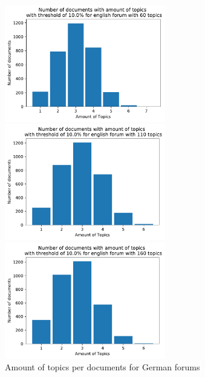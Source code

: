 \begin{figure}[t]
	\centering
	\includegraphics[width=7cm]{gfx/GrafikenFinal/englishforumlda_topPerdoc60.pdf}\par\medskip
	\begin{minipage}{0.5\textwidth}
		\centering
		\includegraphics[width=7cm]{gfx/GrafikenFinal/englishforumlda_topPerdoc110.pdf}
	\end{minipage}%
	\begin{minipage}{0.5\textwidth}
		\centering
		\includegraphics[width=7cm]{gfx/GrafikenFinal/englishforumlda_topPerdoc160.pdf}
	\end{minipage}
	\caption[]{Amount of topics per documents for German forums}
\end{figure}


